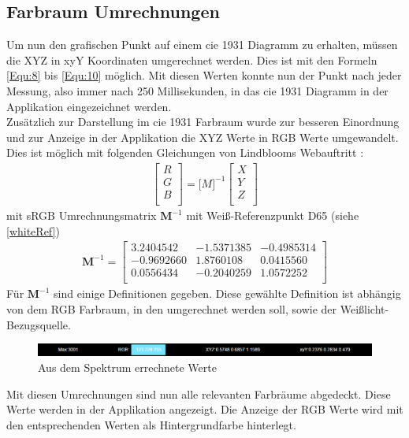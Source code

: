 \documentclass[11pt]{scrartcl}
\begin{document}
\subsection{Farbraum Umrechnungen}
Um nun den grafischen Punkt auf einem \ac{cie} 1931 Diagramm zu erhalten, müssen die XYZ in xyY Koordinaten umgerechnet werden. Dies ist mit den
Formeln \ref{Equ:8} bis \ref{Equ:10} möglich. Mit diesen Werten konnte nun der Punkt nach jeder Messung, also immer nach 250 Millisekunden, 
in das \ac{cie} 1931 Diagramm in der Applikation eingezeichnet werden.\\
Zusätzlich zur Darstellung im \ac{cie} 1931 Farbraum wurde zur besseren Einordnung und zur Anzeige in der Applikation die XYZ Werte in RGB Werte
umgewandelt. Dies ist möglich mit folgenden Gleichungen von Lindblooms Webauftritt \cite{lindbloom}:
\begin{align}\label{Equ:12}
    \left[ \begin{array}{r}
        R \\
        G \\
        B \\
    \end{array}\right]
    = {\mathbf[M]^{-1}} \left[ \begin{array}{r}
        X \\
        Y \\
        Z \\
    \end{array}\right]
\end{align}
mit sRGB Umrechnungsmatrix $\mathbf M^{-1}$ mit Weiß-Referenzpunkt D65 (siehe \ref{whiteRef})
\begin{align}\label{Equ:13}
    \mathbf M^{-1} = \left[ \begin{array}{rrr}
        3.2404542  & -1.5371385 & -0.4985314 \\
        -0.9692660 & 1.8760108  & 0.0415560  \\
        0.0556434  & -0.2040259 & 1.0572252  \\
    \end{array}\right]
\end{align}
Für $\mathbf M^{-1}$ sind einige Definitionen gegeben. Diese gewählte Definition ist abhängig von dem RGB Farbraum, in den umgerechnet werden soll, sowie
der Weißlicht-Bezugsquelle.
\begin{figure}[H]
    \begin{center}
        \includegraphics[width=\textwidth]{images/app_dummy_info_with_rgb.png}
    \end{center}
    \caption{Aus dem Spektrum errechnete Werte}
\end{figure}
\noindent
Mit diesen Umrechnungen sind nun alle relevanten Farbräume abgedeckt. Diese Werte werden in der Applikation angezeigt. Die Anzeige der RGB Werte
wird mit den entsprechenden Werten als Hintergrundfarbe hinterlegt.
\end{document}
